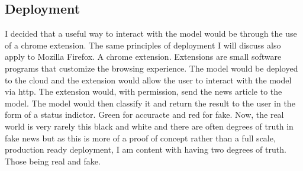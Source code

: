 \subsection{Deployment}
I decided that a useful way to interact with the model would be through the use of a chrome extension. The same principles of deployment I will discuss also apply to Mozilla Firefox. A chrome extension. Extensions are small software programs that customize the browsing experience. The model would be deployed to the cloud and the extension would allow the user to interact with the model via http. The extension would, with permission, send the news article to the model. The model would then classify it and return the result to the user in the form of a status indictor. Green for accuracte and red for fake. Now, the real world is very rarely this black and white and there are often degrees of truth in fake news but as this is more of a proof of concept rather than a full scale, production ready deployment, I am content with having two degrees of truth. Those being real and fake. 
